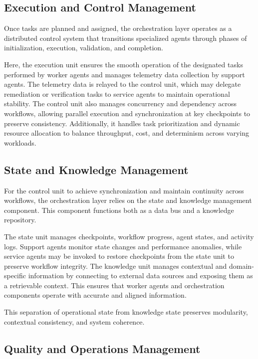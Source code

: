\documentclass[conference]{IEEEtran}
\begin{document}
\subsection{Execution and Control Management}

Once tasks are planned and assigned, the orchestration layer operates as a distributed control system that transitions specialized agents through phases of initialization, execution, validation, and completion.  

Here, the execution unit ensures the smooth operation of the designated tasks performed by worker agents and manages telemetry data collection by support agents. The telemetry data is relayed to the control unit, which may delegate remediation or verification tasks to service agents to maintain operational stability. The control unit also manages concurrency and dependency across workflows, allowing parallel execution and synchronization at key checkpoints to preserve consistency. Additionally, it handles task prioritization and dynamic resource allocation to balance throughput, cost, and determinism across varying workloads. 

\subsection{State and Knowledge Management}

For the control unit to achieve synchronization and maintain continuity across workflows, the orchestration layer relies on the state and knowledge management component. This component functions both as a data bus and a knowledge repository.  

The state unit manages checkpoints, workflow progress, agent states, and activity logs. Support agents monitor state changes and performance anomalies, while service agents may be invoked to restore checkpoints from the state unit to preserve workflow integrity. The knowledge unit manages contextual and domain-specific information by connecting to external data sources and exposing them as a retrievable context. This ensures that worker agents and orchestration components operate with accurate and aligned information.  

This separation of operational state from knowledge state preserves modularity, contextual consistency, and system coherence. 

\subsection{Quality and Operations Management}
\end{document}
